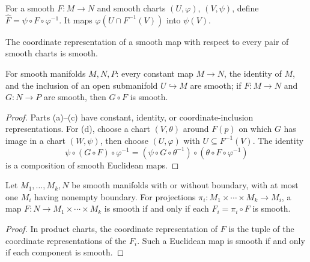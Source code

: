 \begin{definition}
\label{def:2-8-extra-6}




For a smooth $F:M\to N$ and smooth charts $(U,\varphi)$, $(V,\psi)$, define $\widehat F=\psi\circ F\circ\varphi^{-1}$. It maps $\varphi(U\cap F^{-1}(V))$ into $\psi(V)$.
\end{definition}

\begin{lemma}
\label{exer:2-9}




The coordinate representation of a smooth map with respect to every pair of smooth charts is smooth.
\end{lemma}

\begin{proposition}
\label{prop:2-10}




For smooth manifolds $M,N,P$: every constant map $M\to N$, the identity of $M$, and the inclusion of an open submanifold $U\hookrightarrow M$ are smooth; if $F:M\to N$ and $G:N\to P$ are smooth, then $G\circ F$ is smooth.
\end{proposition}

\begin{proof}
\sketch Parts (a)--(c) have constant, identity, or coordinate-inclusion representations. For (d), choose a chart $(V,\theta)$ around $F(p)$ on which $G$ has image in a chart $(W,\psi)$, then choose $(U,\varphi)$ with $U\subseteq F^{-1}(V)$. The identity
\[
\psi\circ(G\circ F)\circ\varphi^{-1}=(\psi\circ G\circ\theta^{-1})\circ(\theta\circ F\circ\varphi^{-1})
\]
is a composition of smooth Euclidean maps.
\end{proof}


\begin{proposition}
\label{prop:2-12}




Let $M_1,\ldots,M_k,N$ be smooth manifolds with or without boundary, with at most one $M_i$ having nonempty boundary. For projections $\pi_i:M_1\times\cdots\times M_k\to M_i$, a map $F:N\to M_1\times\cdots\times M_k$ is smooth if and only if each $F_i=\pi_i\circ F$ is smooth.
\end{proposition}

\begin{proof}

\sketch In product charts, the coordinate representation of $F$ is the tuple
of the coordinate representations of the $F_i$. Such a Euclidean map is smooth
if and only if each component is smooth.
\end{proof}

